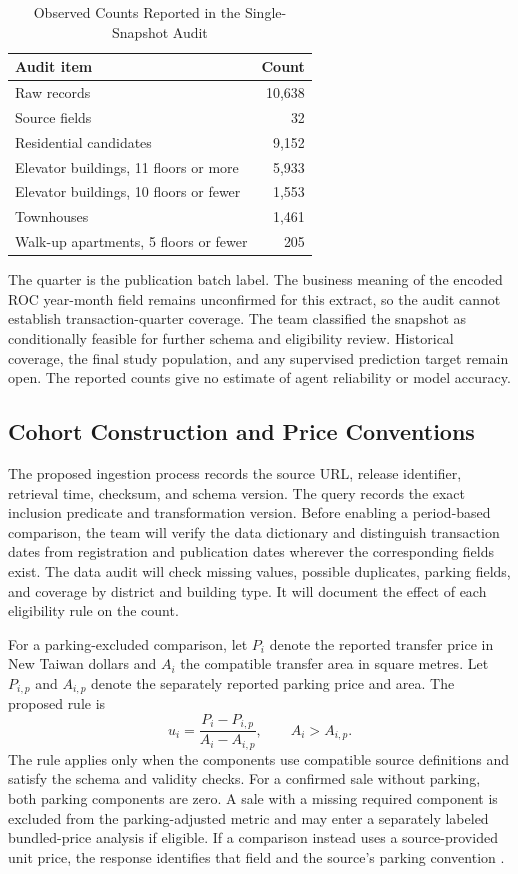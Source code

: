 \documentclass[conference]{IEEEtran}
\begin{document}
\begin{table}[t]
\caption{Observed Counts Reported in the Single-Snapshot Audit}
\label{tab:snapshot}
\centering
\begin{tabularx}{\columnwidth}{@{}Xr@{}}
\toprule
Audit item & Count \\
\midrule
Raw records & 10,638 \\
Source fields & 32 \\
Residential candidates & 9,152 \\
\quad Elevator buildings, 11 floors or more & 5,933 \\
\quad Elevator buildings, 10 floors or fewer & 1,553 \\
\quad Townhouses & 1,461 \\
\quad Walk-up apartments, 5 floors or fewer & 205 \\
\bottomrule
\end{tabularx}
\end{table}

The quarter is the publication batch label. The business meaning of the encoded ROC year-month field remains unconfirmed for this extract, so the audit cannot establish transaction-quarter coverage. The team classified the snapshot as conditionally feasible for further schema and eligibility review. Historical coverage, the final study population, and any supervised prediction target remain open. The reported counts give no estimate of agent reliability or model accuracy.

\subsection{Cohort Construction and Price Conventions}
The proposed ingestion process records the source URL, release identifier, retrieval time, checksum, and schema version. The query records the exact inclusion predicate and transformation version. Before enabling a period-based comparison, the team will verify the data dictionary and distinguish transaction dates from registration and publication dates wherever the corresponding fields exist. The data audit will check missing values, possible duplicates, parking fields, and coverage by district and building type. It will document the effect of each eligibility rule on the count.

For a parking-excluded comparison, let \(P_i\) denote the reported transfer price in New Taiwan dollars and \(A_i\) the compatible transfer area in square metres. Let \(P_{i,p}\) and \(A_{i,p}\) denote the separately reported parking price and area. The proposed rule is
\begin{equation}
u_i = \frac{P_i-P_{i,p}}{A_i-A_{i,p}},
\qquad A_i>A_{i,p}.
\label{eq:unitprice}
\end{equation}
The rule applies only when the components use compatible source definitions and satisfy the schema and validity checks. For a confirmed sale without parking, both parking components are zero. A sale with a missing required component is excluded from the parking-adjusted metric and may enter a separately labeled bundled-price analysis if eligible. If a comparison instead uses a source-provided unit price, the response identifies that field and the source's parking convention \cite{moi}.
\end{document}
